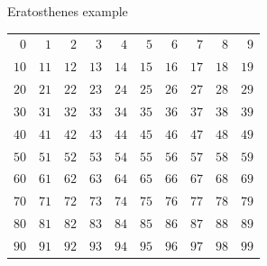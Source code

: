 \documentclass{beamer}
\begin{document}
\begin{frame}[plain]{Eratosthenes example}
	\only<all:1> {
		\begin{tabular}{r r r r r r r r r r}
			\color{black}  $0$ & \color{black}  $1$ & \color{black}  $2$ & \color{black}  $3$ & \color{black}  $4$ & \color{black}  $5$ & \color{black}  $6$ & \color{black}  $7$ & \color{black}  $8$ & \color{black}  $9$\\
			\color{black} $10$ & \color{black} $11$ & \color{black} $12$ & \color{black} $13$ & \color{black} $14$ & \color{black} $15$ & \color{black} $16$ & \color{black} $17$ & \color{black} $18$ & \color{black} $19$\\
			\color{black} $20$ & \color{black} $21$ & \color{black} $22$ & \color{black} $23$ & \color{black} $24$ & \color{black} $25$ & \color{black} $26$ & \color{black} $27$ & \color{black} $28$ & \color{black} $29$\\
			\color{black} $30$ & \color{black} $31$ & \color{black} $32$ & \color{black} $33$ & \color{black} $34$ & \color{black} $35$ & \color{black} $36$ & \color{black} $37$ & \color{black} $38$ & \color{black} $39$\\
			\color{black} $40$ & \color{black} $41$ & \color{black} $42$ & \color{black} $43$ & \color{black} $44$ & \color{black} $45$ & \color{black} $46$ & \color{black} $47$ & \color{black} $48$ & \color{black} $49$\\
			\color{black} $50$ & \color{black} $51$ & \color{black} $52$ & \color{black} $53$ & \color{black} $54$ & \color{black} $55$ & \color{black} $56$ & \color{black} $57$ & \color{black} $58$ & \color{black} $59$\\
			\color{black} $60$ & \color{black} $61$ & \color{black} $62$ & \color{black} $63$ & \color{black} $64$ & \color{black} $65$ & \color{black} $66$ & \color{black} $67$ & \color{black} $68$ & \color{black} $69$\\
			\color{black} $70$ & \color{black} $71$ & \color{black} $72$ & \color{black} $73$ & \color{black} $74$ & \color{black} $75$ & \color{black} $76$ & \color{black} $77$ & \color{black} $78$ & \color{black} $79$\\
			\color{black} $80$ & \color{black} $81$ & \color{black} $82$ & \color{black} $83$ & \color{black} $84$ & \color{black} $85$ & \color{black} $86$ & \color{black} $87$ & \color{black} $88$ & \color{black} $89$\\
			\color{black} $90$ & \color{black} $91$ & \color{black} $92$ & \color{black} $93$ & \color{black} $94$ & \color{black} $95$ & \color{black} $96$ & \color{black} $97$ & \color{black} $98$ & \color{black} $99$\\

\end{tabular}}
\end{frame}
\end{document}
